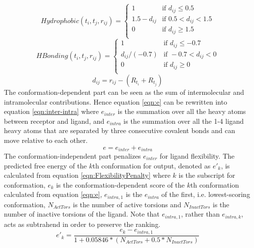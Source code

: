 \documentclass[10pt, conference, compsocconf]{../IEEEtran}
\begin{document}
\begin{equation}
\label{eqn:Hydrophobic}
Hydrophobic(t_i, t_j, r_{ij}) =
\begin{cases}
1 & \text{if } d_{ij} \leq 0.5\\
1.5 - d_{ij} & \text{if } 0.5 < d_{ij} < 1.5\\
0 & \text{if } d_{ij} \geq 1.5\\
\end{cases}
\end{equation}
\begin{equation}
\label{eqn:HBonding}
HBonding(t_i, t_j, r_{ij}) =
\begin{cases}
1 & \text{if } d_{ij} \leq -0.7\\
d_{ij} / (-0.7) & \text{if } -0.7 < d_{ij} < 0\\
0 & \text{if } d_{ij} \geq 0\\
\end{cases}
\end{equation}
\begin{equation}
\label{eqn:dij}
d_{ij} = r_{ij} - (R_{t_i} + R_{t_j})
\end{equation}
The conformation-dependent part can be seen as the sum of intermolecular and intramolecular contributions. Hence equation \eqref{eqn:e} can be rewritten into equation \eqref{eqn:inter-intra} where $e_{inter}$ is the summation over all the heavy atoms between receptor and ligand, and $e_{intra}$ is the summation over all the 1-4 ligand heavy atoms that are separated by three consecutive covalent bonds and can move relative to each other.
\begin{equation}
\label{eqn:inter-intra}
e = e_{inter} + e_{intra}
\end{equation}
The conformation-independent part penalizes $e_{inter}$ for ligand flexibility. The predicted free energy of the $k$th conformation for output, denoted as $e'_k$, is calculated from equation \eqref{eqn:FlexibilityPenalty} where $k$ is the subscript for conformation, $e_k$ is the conformation-dependent score of the $k$th conformation calculated from equation \eqref{eqn:e}, $e_{intra,1}$ is the $e_{intra}$ of the first, i.e. lowest-scoring conformation, $N_{ActTors}$ is the number of active torsions and $N_{InactTors}$ is the number of inactive torsions of the ligand. Note that $e_{intra,1}$, rather than $e_{intra,k}$, acts as subtrahend in order to preserve the ranking.
\begin{equation}
\label{eqn:FlexibilityPenalty}
e'_k = \frac{e_k - e_{intra,1}}{1 + 0.05846 * (N_{ActTors} + 0.5 * N_{InactTors})}
\end{equation}
\end{document}
